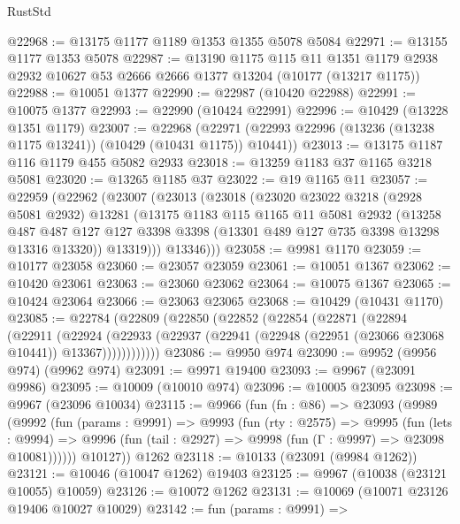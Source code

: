 \begin{lexlean}{RustStd}
\begin{coremodule}
{\begin{coremodule}
{{{{{{{{{{{{{{{{{{{{{{{{{{{{{{{{{{{{{{{{{{{{{{{{{{{{{{{{{{{{{{{{{{{{{{{{{{{{{{@22968 := @13175 @1177 @1189 @1353 @1355 @5078 @5084
@22971 := @13155 @1177 @1353 @5078
@22987 := @13190
    @1175
    @115
    @11
    @1351
    @1179
    @2938
    @2932
    @10627
    @53
    @2666
    @2666
    @1377
    @13204
    (@10177 (@13217 @1175))
@22988 := @10051 @1377
@22990 := @22987 (@10420 @22988)
@22991 := @10075 @1377
@22993 := @22990 (@10424 @22991)
@22996 := @10429 (@13228 @1351 @1179)
@23007 := @22968
    (@22971 (@22993 @22996 (@13236 (@13238 @1175 @13241)) (@10429 (@10431 @1175)) @10441))
@23013 := @13175 @1187 @116 @1179 @455 @5082 @2933
@23018 := @13259 @1183 @37 @1165 @3218 @5081
@23020 := @13265 @1185 @37
@23022 := @19 @1165 @11
@23057 := @22959
    (@22962
      (@23007
        (@23013
          (@23018
            (@23020
              @23022
              @3218
              (@2928 @5081 @2932)
              @13281
              (@13175
                @1183
                @115
                @1165
                @11
                @5081
                @2932
                (@13258
                  @487
                  @487
                  @127
                  @127
                  @3398
                  @3398
                  (@13301 @489 @127 @735 @3398 @13298 @13316 @13320))
                @13319)))
          @13346)))
@23058 := @9981 @1170
@23059 := @10177 @23058
@23060 := @23057 @23059
@23061 := @10051 @1367
@23062 := @10420 @23061
@23063 := @23060 @23062
@23064 := @10075 @1367
@23065 := @10424 @23064
@23066 := @23063 @23065
@23068 := @10429 (@10431 @1170)
@23085 := @22784
    (@22809
      (@22850
        (@22852
          (@22854
            (@22871
              (@22894
                (@22911
                  (@22924
                    (@22933
                      (@22937 (@22941 (@22948 (@22951 (@23066 @23068 @10441)) @13367))))))))))))
@23086 := @9950 @974
@23090 := @9952 (@9956 @974) (@9962 @974)
@23091 := @9971 @19400
@23093 := @9967 (@23091 @9986)
@23095 := @10009 (@10010 @974)
@23096 := @10005 @23095
@23098 := @9967 (@23096 @10034)
@23115 := @9966
    (fun (fn : @86) =>
    @23093
      (@9989
        (@9992
          (fun (params : @9991) =>
          @9993
            (fun (rty : @2575) =>
            @9995
              (fun (lets : @9994) =>
              @9996 (fun (tail : @2927) => @9998 (fun (Γ : @9997) => @23098 @10081))))))
        @10127))
    @1262
@23118 := @10133 (@23091 (@9984 @1262))
@23121 := @10046 (@10047 @1262) @19403
@23125 := @9967 (@10038 (@23121 @10055) @10059)
@23126 := @10072 @1262
@23131 := @10069 (@10071 @23126 @19406 @10027 @10029)
@23142 := fun (params : @9991) =>
}}}}}}}}}}}}}}}}}}}}}}}}}}}}}}}}}}}}}}}}}}}}}}}}}}}}}}}}}}}}}}}}}}}}}}}}}}}}}}
\end{coremodule}}
\end{coremodule}
\end{lexlean}

